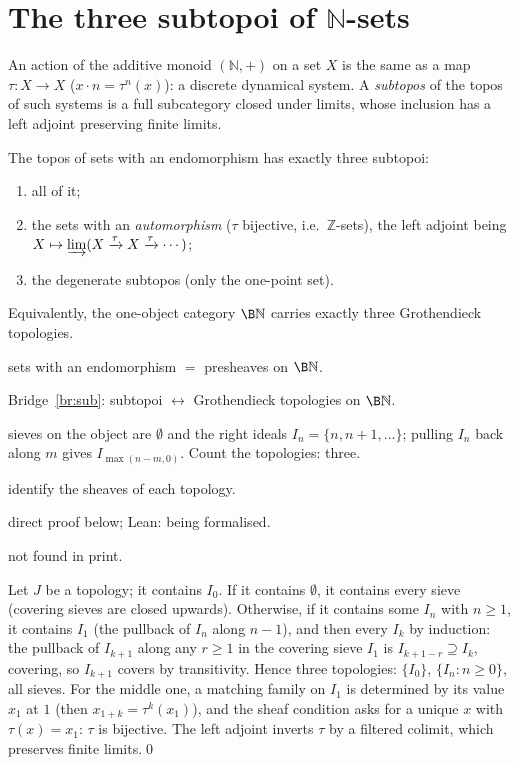 \section{The three subtopoi of $\mathbb N$-sets}\label{sec:dynamics}

An action of the additive monoid $(\mathbb N,+)$ on a set $X$ is the same as a map $\tau : X\to X$ ($x\cdot n = \tau^n(x)$): a discrete dynamical system. A \emph{subtopos} of the topos of such systems is a full subcategory closed under limits, whose inclusion has a left adjoint preserving finite limits.

\begin{theorem}\label{th:dynamics}
The topos of sets with an endomorphism has exactly three subtopoi:
\begin{enumerate}
\item all of it;
\item the sets with an \emph{automorphism} ($\tau$ bijective, i.e.\ $\mathbb Z$-sets), the left adjoint being $X\mapsto\varinjlim(X\xrightarrow{\tau}X\xrightarrow{\tau}\cdots)$;
\item the degenerate subtopos (only the one-point set).
\end{enumerate}
Equivalently, the one-object category $\B\mathbb N$ carries exactly three Grothendieck topologies.
\end{theorem}

\begin{trace}
\item[deck] sets with an endomorphism $=$ presheaves on $\B\mathbb N$.
\item[arch] Bridge~\ref{br:sub}: subtopoi $\leftrightarrow$ Grothendieck topologies on $\B\mathbb N$.
\item[specialise] sieves on the object are $\emptyset$ and the right ideals $I_n = \{n,n+1,\dots\}$; pulling $I_n$ back along $m$ gives $I_{\max(n-m,0)}$. Count the topologies: three.
\item[unfold] identify the sheaves of each topology.
\item[verify] direct proof below; Lean: %
being formalised.
\item[novelty] not found in print.
\end{trace}

\direct{} Let $J$ be a topology; it contains $I_0$. If it contains $\emptyset$, it contains every sieve (covering sieves are closed upwards). Otherwise, if it contains some $I_n$ with $n\ge 1$, it contains $I_1$ (the pullback of $I_n$ along $n-1$), and then every $I_k$ by induction: the pullback of $I_{k+1}$ along any $r\ge 1$ in the covering sieve $I_1$ is $I_{k+1-r}\supseteq I_k$, covering, so $I_{k+1}$ covers by transitivity. Hence three topologies: $\{I_0\}$, $\{I_n : n\ge 0\}$, all sieves. For the middle one, a matching family on $I_1$ is determined by its value $x_1$ at $1$ (then $x_{1+k} = \tau^k(x_1)$), and the sheaf condition asks for a unique $x$ with $\tau(x) = x_1$: $\tau$ is bijective. The left adjoint inverts $\tau$ by a filtered colimit, which preserves finite limits.\qed

